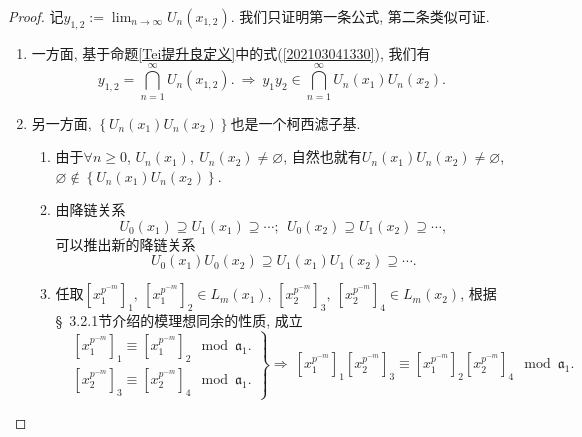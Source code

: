 \documentclass[UTF8, twoside]{ctexart}
\theoremstyle{nonumberplain}
\newtheorem{proof}{\heiti 证明}  %
\theoremstyle{nonumberplain}
\theoremstyle{plain}
\begin{document}
	\begin{proof}
		记${{y}_{1,2}}:=\lim_{n\to \infty }{{U}_{n}}\left( {{x}_{1,2}} \right)$.
		我们只证明第一条公式, 第二条类似可证.
		\vskip 0.3cm
		\begin{enumerate}
			\item 一方面, 基于命题\ref{Tei提升良定义}中的式(\ref{202103041330}), 我们有
			\begin{equation} \label{202103041403_1}
				{{y}_{1,2}}=\bigcap\limits_{n=1}^{\infty }{{{U}_{n}}\left( {{x}_{1,2}} \right)}.
				\ \Longrightarrow \ 
				{{y}_{1}}{{y}_{2}}\in \bigcap\limits_{n=1}^{\infty }{{{U}_{n}}\left( {{x}_{1}} \right){{U}_{n}}\left( {{x}_{2}} \right)}.
			\end{equation}
			\vskip 0.3cm
			
			\item 另一方面, $\left\{ {{U}_{n}}\left( {{x}_{1}} \right){{U}_{n}}\left( {{x}_{2}} \right) \right\}$也是一个柯西滤子基.
			\vskip 0.3cm
			\begin{enumerate}
				\item 由于$\forall n\ge 0$, ${{U}_{n}}\left( {{x}_{1}} \right),\ {{U}_{n}}\left( {{x}_{2}} \right)\ne \varnothing $, 自然也就有${{U}_{n}}\left( {{x}_{1}} \right){{U}_{n}}\left( {{x}_{2}} \right)\ne \varnothing $, $\varnothing \notin \left\{ {{U}_{n}}\left( {{x}_{1}} \right){{U}_{n}}\left( {{x}_{2}} \right) \right\}$.
				\vskip 0.3cm
				
				\item 由降链关系
				\[
					{{U}_{0}}\left( {{x}_{1}} \right)\supseteq {{U}_{1}}\left( {{x}_{1}} \right)\supseteq \cdots ;\ \ {{U}_{0}}\left( {{x}_{2}} \right)\supseteq {{U}_{1}}\left( {{x}_{2}} \right)\supseteq \cdots ,
				\]
				可以推出新的降链关系
				\begin{equation} \label{202103041403_2}
				{{U}_{0}}\left( {{x}_{1}} \right){{U}_{0}}\left( {{x}_{2}} \right)\supseteq {{U}_{1}}\left( {{x}_{1}} \right){{U}_{1}}\left( {{x}_{2}} \right)\supseteq \cdots .
				\end{equation}
				\vskip 0.3cm
				
				\item 任取${{\left[ x_{1}^{{{p}^{-m}}} \right]}_{1}},\ {{\left[ x_{1}^{{{p}^{-m}}} \right]}_{2}}\in {{L}_{m}}\left( {{x}_{1}} \right)$, ${{\left[ x_{2}^{{{p}^{-m}}} \right]}_{3}},\ {{\left[ x_{2}^{{{p}^{-m}}} \right]}_{4}}\in {{L}_{m}}\left( {{x}_{2}} \right)$, 根据\S~3.2.1节介绍的模理想同余的性质, 成立
				\[\left. \begin{aligned}
					& {{\left[ x_{1}^{{{p}^{-m}}} \right]}_{1}}\equiv {{\left[ x_{1}^{{{p}^{-m}}} \right]}_{2}}\ \bmod {{\mathfrak{a}}_{1}}. \\ 
					& {{\left[ x_{2}^{{{p}^{-m}}} \right]}_{3}}\equiv {{\left[ x_{2}^{{{p}^{-m}}} \right]}_{4}}\ \bmod {{\mathfrak{a}}_{1}}.
				\end{aligned} \right\}\Longrightarrow \ {{\left[ x_{1}^{{{p}^{-m}}} \right]}_{1}}{{\left[ x_{2}^{{{p}^{-m}}} \right]}_{3}}\equiv {{\left[ x_{1}^{{{p}^{-m}}} \right]}_{2}}{{\left[ x_{2}^{{{p}^{-m}}} \right]}_{4}}
			\ \bmod {{\mathfrak{a}}_{1}}.\]
			\end{enumerate}
			\vskip 0.3cm
			

\end{enumerate}
\end{proof}
\end{document}
